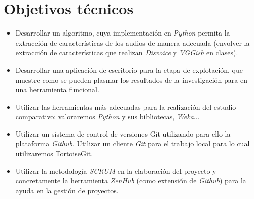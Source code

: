 \section{Objetivos técnicos}
\begin{itemize}
	\item Desarrollar un algoritmo, cuya implementación en \textit{Python} permita la extracción de características de los audios de manera adecuada (envolver la extracción de características que realizan \textit{Disvoice} y \textit{VGGish} en clases).
	\item Desarrollar una aplicación de escritorio para la etapa de explotación, que muestre como se pueden plasmar los resultados de la investigación para en una herramienta funcional. 
	\item Utilizar las herramientas más adecuadas para la realización del estudio comparativo: valoraremos \textit{Python} y sus bibliotecas, \textit{Weka}...
	\item Utilizar un sistema de control de versiones Git utilizando para ello la plataforma \textit{Github}. Utilizar un cliente \textit{Git} para el trabajo local para lo cual utilizaremos TortoiseGit.
	\item Utilizar la metodología \textit{SCRUM} en la elaboración del proyecto y concretamente la herramienta \textit{ZenHub} (como extensión de \textit{Github}) para la ayuda en la gestión de proyectos.
	
	
\end{itemize}